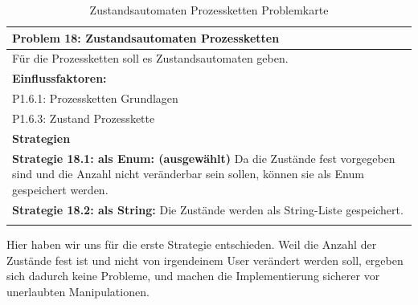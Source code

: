 \documentclass[enabledeprecatedfontcommands,fontsize=12pt,paper=a4,twoside]{scrartcl}
\begin{document}
\begin{table}[H]
    \centering
    \begin{tabular}{|p{15cm}|}
    \hline
          \textbf{Problem 18:} Zustandsautomaten Prozessketten
          \\ \hline
          Für die Prozessketten soll es Zustandsautomaten geben. 
          \\ \hline
          \textbf{Einflussfaktoren: } \\
         P1.6.1: Prozessketten Grundlagen \\ 
	P1.6.3: Zustand Prozesskette \\
          \hline
          \textbf{Strategien} \\ \hline
          	 {}          
           \label{strategie:18.1} 
	\textbf{Strategie 18.1: als Enum: (ausgewählt)} Da die Zustände fest vorgegeben sind und die Anzahl nicht veränderbar sein sollen, können sie als Enum gespeichert werden. \\
		 {}          
           \label{strategie:18.2} 
	\textbf{Strategie 18.2: als String:} Die Zustände werden als String-Liste gespeichert. \\
          \\ \hline
    \end{tabular}
    \caption{Zustandsautomaten Prozessketten Problemkarte}
    \label{tab:ProblemKarte18}
\end{table}
Hier haben wir uns für die erste Strategie entschieden. Weil die Anzahl der Zustände fest ist und nicht von irgendeinem User verändert werden soll, ergeben sich dadurch keine Probleme, und machen die Implementierung sicherer vor unerlaubten Manipulationen. \\
\end{document}
